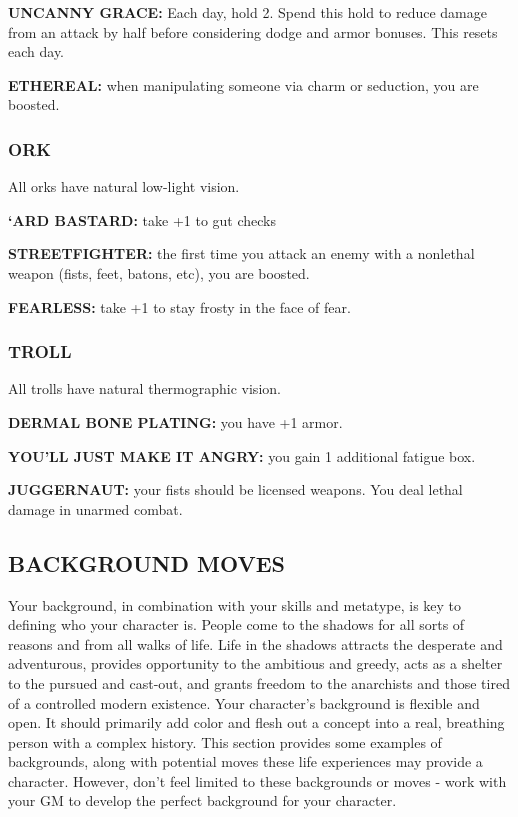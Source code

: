 \documentclass[oneside,10pt]{article}
\begin{document}
\begin{multicols}{2}
\begin{dent}
\textbf{UNCANNY GRACE:} Each day, hold 2. Spend this hold to reduce
damage from an attack by half before considering dodge and armor
bonuses. This resets each day.

\textbf{ETHEREAL:} when manipulating someone via charm or seduction, you are boosted.
\end{dent}

\subsubsection{ORK}
\label{metatype_ork}
All orks have natural low-light vision.

\begin{dent}

\textbf{‘ARD BASTARD:} take +1 to gut checks

\textbf{STREETFIGHTER:} the first time you attack an enemy with a
nonlethal weapon (fists, feet, batons, etc), you
are boosted.

\textbf{FEARLESS:} take +1 to stay frosty in the face of fear.
\end{dent}

\subsubsection{TROLL}
\label{metatype_troll}
All trolls have natural thermographic vision.

\begin{dent}

\textbf{DERMAL BONE PLATING:} you have +1 armor.

\textbf{YOU’LL JUST MAKE IT ANGRY:} you gain 1 additional fatigue
box.

\textbf{JUGGERNAUT:} your fists should be licensed weapons. You
deal lethal damage in unarmed combat.
\end{dent}

\subsection{BACKGROUND MOVES}
\label{backgrounds}
Your background, in combination with your skills and metatype, is key
to defining who your character is. People come to the shadows for all
sorts of reasons and from all walks of life. Life in the shadows
attracts the desperate and adventurous, provides opportunity to the
ambitious and greedy, acts as a shelter to the pursued and cast-out,
and grants freedom to the anarchists and those tired of a controlled
modern existence. Your character's background is flexible and open. It
should primarily add color and flesh out a concept into a real,
breathing person with a complex history. This section provides some
examples of backgrounds, along with potential moves these life
experiences may provide a character. However, don't feel limited to
these backgrounds or moves - work with your GM to develop the perfect
background for your character.


\end{multicols}
\end{document}
